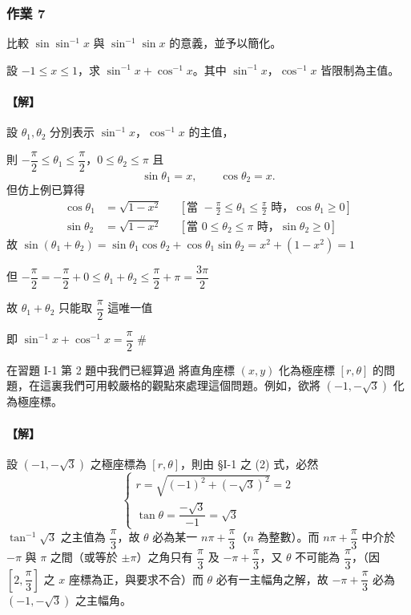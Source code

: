 \medskip
\subsubsection*{作業 7}
比較 $\sin \sin^{-1} x$ 與 $\sin^{-1} \sin x$ 的意義，並予以簡化。

\medskip
\begin{example}\label{ex:b5-1-2-2}
設 $-1 \le x \le 1$，求 $\sin^{-1} x + \cos^{-1} x$。其中 $\sin^{-1} x$，$\cos^{-1} x$ 皆限制為主值。
\end{example}
\paragraph{【解】}
設 $\theta_1, \theta_2$ 分別表示 $\sin^{-1} x$，$\cos^{-1} x$ 的主值，

則 $-\dfrac{\pi}{2} \le \theta_1 \le \dfrac{\pi}{2}$，$0 \le \theta_2 \le \pi$ 且
\[
\sin \theta_1 = x, \qquad \cos \theta_2 = x.
\]
但仿上例已算得
\begin{align*}
\cos \theta_1 &= \sqrt{1 - x^2} && \left[\text{當 } -\frac{\pi}{2} \le \theta_1 \le \frac{\pi}{2} \text{ 時，}\cos \theta_1 \ge 0\right] \\[0.3em]
\sin \theta_2 &= \sqrt{1 - x^2} && \left[\text{當 } 0 \le \theta_2 \le \pi \text{ 時，}\sin \theta_2 \ge 0\right]
\end{align*}
故 $\sin(\theta_1 + \theta_2) = \sin \theta_1 \cos \theta_2 + \cos \theta_1 \sin \theta_2 = x^2 + (1 - x^2) = 1$

但 $-\dfrac{\pi}{2} = -\dfrac{\pi}{2} + 0 \le \theta_1 + \theta_2 \le \dfrac{\pi}{2} + \pi = \dfrac{3\pi}{2}$

故 $\theta_1 + \theta_2$ 只能取 $\dfrac{\pi}{2}$ 這唯一值

即 $\sin^{-1} x + \cos^{-1} x = \dfrac{\pi}{2}$ \hfill $\#$

\medskip
\begin{example}\label{ex:b5-1-2-3}
在習題 I-1 第 2 題中我們已經算過 將直角座標 $(x, y)$ 化為極座標 $[r, \theta]$ 的問題，在這裏我們可用較嚴格的觀點來處理這個問題。例如，欲將 $(-1, -\sqrt{3})$ 化為極座標。
\end{example}
\paragraph{【解】}
設 $(-1, -\sqrt{3})$ 之極座標為 $[r, \theta]$，則由 \S I-1 之 (2) 式，必然
\[
\begin{cases}
r = \sqrt{(-1)^2 + (-\sqrt{3})^2} = 2 \\[0.5em]
\tan \theta = \dfrac{-\sqrt{3}}{-1} = \sqrt{3}
\end{cases}
\]
$\tan^{-1} \sqrt{3}$ 之主值為 $\dfrac{\pi}{3}$，故 $\theta$ 必為某一 $n\pi + \dfrac{\pi}{3}$（$n$ 為整數）。而 $n\pi + \dfrac{\pi}{3}$ 中介於 $-\pi$ 與 $\pi$ 之間（或等於 $\pm\pi$）之角只有 $\dfrac{\pi}{3}$ 及 $-\pi + \dfrac{\pi}{3}$，又 $\theta$ 不可能為 $\dfrac{\pi}{3}$，（因 $\left[2, \dfrac{\pi}{3}\right]$ 之 $x$ 座標為正，與要求不合）而 $\theta$ 必有一主幅角之解，故 $-\pi + \dfrac{\pi}{3}$ 必為 $(-1, -\sqrt{3})$ 之主幅角。

